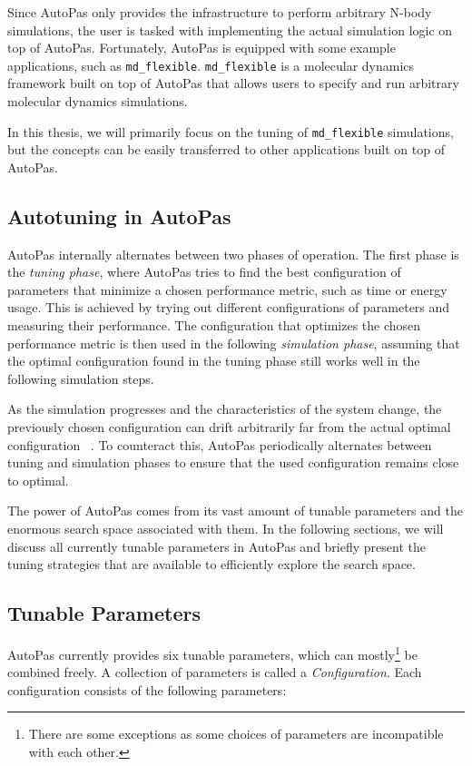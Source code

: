 Since AutoPas only provides the infrastructure to perform arbitrary N-body simulations, the user is tasked with implementing the actual simulation logic on top of AutoPas. Fortunately, AutoPas is equipped with some example applications, such as \texttt{md\_flexible}. \texttt{md\_flexible} is a molecular dynamics framework built on top of AutoPas that allows users to specify and run arbitrary molecular dynamics simulations.

In this thesis, we will primarily focus on the tuning of \texttt{md\_flexible} simulations, but the concepts can be easily transferred to other applications built on top of AutoPas.

\subsection{Autotuning in AutoPas}

AutoPas internally alternates between two phases of operation. The first phase is the \emph{tuning phase}, where AutoPas tries to find the best configuration of parameters that minimize a chosen performance metric, such as time or energy usage. This is achieved by trying out different configurations of parameters and measuring their performance. The configuration that optimizes the chosen performance metric is then used in the following \emph{simulation phase}, assuming that the optimal configuration found in the tuning phase still works well in the following simulation steps.

As the simulation progresses and the characteristics of the system change, the previously chosen configuration can drift arbitrarily far from the actual optimal configuration ~\cite{GRATL2022108262}. To counteract this, AutoPas periodically alternates between tuning and simulation phases to ensure that the used configuration remains close to optimal.

The power of AutoPas comes from its vast amount of tunable parameters and the enormous search space associated with them. In the following sections, we will discuss all currently tunable parameters in AutoPas and briefly present the tuning strategies that are available to efficiently explore the search space.

\subsection{Tunable Parameters}

AutoPas currently provides six tunable parameters, which can mostly\footnote{There are some exceptions as some choices of parameters are incompatible with each other.} be combined freely. A collection of parameters is called a \emph{Configuration}. Each configuration consists of the following parameters:

